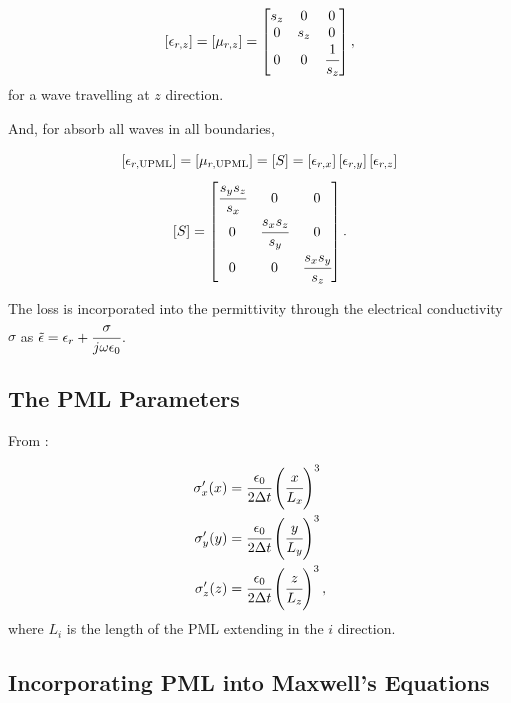 \begin{equation}
    \brackets{\epsilon_{r,z}} = \brackets{\mu_{r,z}} = \begin{bmatrix}
        s_z & 0 & 0 \\
        0 & s_z & 0 \\
        0 & 0 & \cfrac{1}{s_z}
    \end{bmatrix},
\end{equation}
for a wave travelling at $z$ direction.

And, for absorb all waves in all boundaries,

\begin{equation}
    \brackets{\epsilon_{r,\textnormal{UPML}}} = \brackets{\mu_{r,\textnormal{UPML}}} = \brackets{S} = \brackets{\epsilon_{r,x}}\brackets{\epsilon_{r,y}}\brackets{\epsilon_{r,z}} \nonumber
\end{equation} 
\begin{equation}
    \brackets{S} = \begin{bmatrix}
        \cfrac{s_ys_z}{s_x} & 0 & 0 \\
        0 & \cfrac{s_xs_z}{s_y} & 0 \\
        0 & 0 & \cfrac{s_xs_y}{s_z}
    \end{bmatrix}.
\end{equation}

The loss is incorporated into the permittivity through the electrical conductivity $\sigma$ as $\tilde{\epsilon} = \epsilon_r + \cfrac{\sigma}{j\omega \epsilon_0}$.

\subsection{The PML Parameters}

From \cite{rumpf_book}:

\begin{align}
    \sigma_x\Prime(x) &= \cfrac{\epsilon_0}{2\dt}\pare{\cfrac{x}{L_x}}^3 \\
    \sigma_y\Prime(y) &= \cfrac{\epsilon_0}{2\dt}\pare{\cfrac{y}{L_y}}^3 \\
    \sigma_z\Prime(z) &= \cfrac{\epsilon_0}{2\dt}\pare{\cfrac{z}{L_z}}^3,
\end{align}
where $L_i$ is the length of the PML extending in the $i$ direction.


\subsection{Incorporating PML into Maxwell's Equations}

